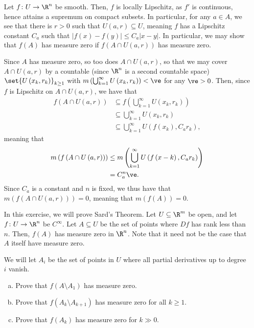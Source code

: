 \documentclass[10pt]{mypackage}
\begin{document}
\begin{solution}
  Let $f\colon U\rightarrow \R^{n}$ be smooth. Then, $f$ is locally Lipschitz, as $f'$ is continuous, hence attains a supremum on compact subsets. In particular, for any $a\in A$, we see that there is $r > 0$ such that $U\left( a,r \right)\subseteq U$, meaning $f$ has a Lipschitz constant $C_{a}$ such that $\left\vert f(x)-f(y) \right\vert \leq C_a\left\vert x-y \right\vert$. In particular, we may show that $f(A)$ has measure zero if $f\left( A\cap U\left( a,r \right) \right)$ has measure zero.\newline

  Since $A$ has measure zero, so too does $A\cap U\left( a,r \right)$, so that we may cover $A\cap U\left( a,r \right)$ by a countable (since $\R^n$ is a second countable space) $\set{U\left( x_k,r_k \right)}_{k\geq 1}$ with $m\left( \bigcup_{k = 1}^{\infty}U\left( x_k,r_k \right) \right) < \ve$ for any $\ve > 0$. Then, since $f$ is Lipschitz on $A\cap U\left( a,r \right)$, we have that
  \begin{align*}
    f\left( A\cap U\left( a,r \right) \right) &\subseteq f\left( \bigcup_{k=1}^{\infty}U\left( x_k,r_k \right) \right)\\
                                              &\subseteq \bigcup_{k=1}^{\infty} U\left( x_k,r_k \right)\\
                                                                  &\subseteq \bigcup_{k=1}^{\infty} U\left( f\left( x_k \right),C_ar_k \right),
  \end{align*}
  meaning that
  \begin{align*}
    m\left( f\left( A\cap U\left( a,r \right) \right) \right) &\leq m\left( \bigcup_{k=1}^{\infty}U\left( f\left( x-k \right),C_ar_k \right) \right)\\
                                                              &= C_a^{n}\ve.
  \end{align*}
  Since $C_a$ is a constant and $n$ is fixed, we thus have that $m\left( f\left( A\cap U\left( a,r \right) \right) \right) = 0$, meaning that $m\left( f(A) \right) = 0$.
\end{solution}
\begin{problem}[Problem 3]
  In this exercise, we will prove Sard's Theorem. Let $U\subseteq \R^{m}$ be open, and let $f\colon U\rightarrow \R^{n}$ be $C^{\infty}$. Let $A\subseteq U$ be the set of points where $Df$ has rank less than $n$. Then, $f(A)$ has measure zero in $\R^{n}$. Note that it need not be the case that $A$ itself have measure zero.\newline

  We will let $A_i$ be the set of points in $U$ where all partial derivatives up to degree $i$ vanish.
  \begin{enumerate}[(a)]
    \item Prove that $f\left( A\setminus A_1 \right)$ has measure zero.
    \item Prove that $f\left( A_k\setminus A_{k+1} \right)$ has measure zero for all $k \geq 1$.
    \item Prove that $f\left( A_k \right)$ has measure zero for $k\gg 0$.
  \end{enumerate}
\end{problem}
\end{document}

